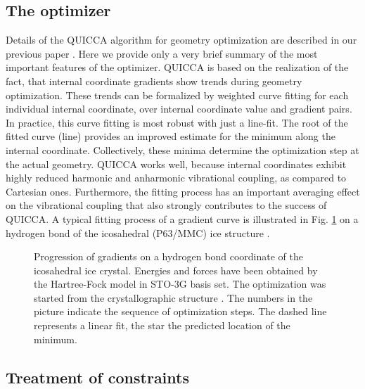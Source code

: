 \documentclass[prl,aps,preprint,superbib,12pt]{revtex4}
\begin{document}
\subsection{The optimizer}
Details of the QUICCA algorithm for geometry optimization are 
described in our previous paper \cite{KNemeth04}. Here we provide 
only a very brief summary of the most important features of the 
optimizer.
QUICCA is based on the realization of the fact, that internal coordinate
gradients show trends during geometry optimization.
These trends can be formalized by weighted curve fitting for each 
individual internal coordinate, over internal coordinate value and 
gradient pairs.
In practice, this curve fitting is most robust with just a line-fit. 
The root of the
fitted curve (line) provides an improved estimate for the minimum
along the internal coordinate. Collectively, these minima determine
the optimization step at the actual geometry.
QUICCA works well, because internal coordinates exhibit  
highly reduced harmonic and anharmonic vibrational coupling, as
compared to Cartesian ones. Furthermore, the fitting process
has an important averaging effect on the vibrational coupling
that also strongly contributes to the success of QUICCA.
A typical fitting process of a gradient curve is illustrated in 
Fig. \ref{iceIh} on a hydrogen bond of the icosahedral (P63/MMC)
ice structure \cite{AGoto90}.

\begin{figure}[h]
\caption{
Progression of gradients on a hydrogen bond coordinate
of the icosahedral ice crystal.
Energies and forces have been obtained by the Hartree-Fock
model in STO-3G basis set.
The optimization was started from the crystallographic structure
\cite{AGoto90}.
The numbers in the picture
indicate the sequence of optimization steps. The dashed line represents
a linear fit, the star the predicted location of the minimum.}
\label{iceIh}
\end{figure}

\subsection{Treatment of constraints}



\end{document}
